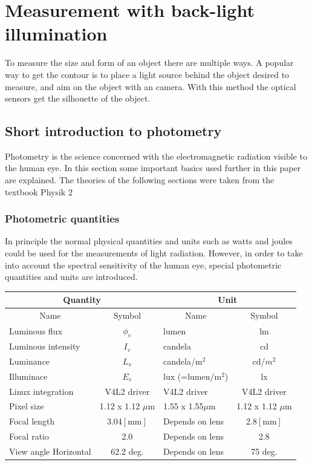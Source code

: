 \section{Measurement with back-light illumination}
To measure the size and form of an object there are multiple ways. A popular way to get the contour is to place a light source behind the object desired to measure, and aim on the object with an camera. With this method the optical sensors get the silhouette of the object. 
\subsection{Short introduction to photometry}
Photometry is the science concerned with the electromagnetic radiation visible to the human eye. In this section some important basics used further in this paper are explained. The theories of the following sections were taken from the textbook Physik 2 \cite{ruh}
\subsubsection{Photometric quantities}
In principle the normal physical quantities and units such as watts and joules could be used for the measurements of light radiation. However, in order to take into account the spectral sensitivity of the human eye, special photometric quantities and units are introduced. 

\begin{tabular}{ |lc|lc|  }
	\hline
	\multicolumn{2}{|c|}{Quantity}&\multicolumn{2}{|c|}{Unit} \\
	\hline\hline
	\multicolumn{1}{|c|}{Name}			& \multicolumn{1}{|c|}{Symbol}	& \multicolumn{1}{|c|}{Name}	& \multicolumn{1}{|c|}{Symbol}\\

	\hline
	Luminous flux		& $\phi_v$			& lumen		& lm\\
	Luminous intensity 	& $I_v$ 		& candela	& cd\\
	Luminance			& $L_v$			& candela/$\text{m}^2$	& cd/$m^2$\\
	Illuminace 			& $E_v$ 		& lux (=lumen/$\text{m}^2$) 	& lx\\
	Linux integration   & V4L2 driver 		& V4L2 driver	& V4L2 driver\\
	Pixel size			& 1.12 x 1.12 $\mu\text{m}$	& 1.55 x 1.55$\mu\text{m}$ & 1.12 x 1.12 $\mu\text{m}$ \\
	Focal length		& 3.04$[\text{mm}]$ & Depends on lens & 2.8$[\text{mm}]$\\
	Focal ratio			& 2.0  				& Depends on lens & 2.8\\
	View angle Horizontal & 62.2 deg.		& Depends on lens & 75 deg.\\
	\hline
\end{tabular}
